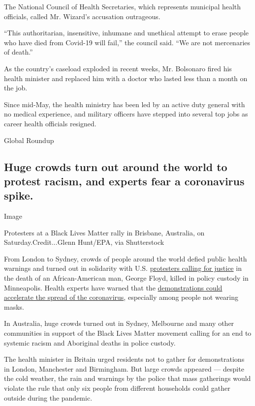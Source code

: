 The National Council of Health Secretaries, which represents municipal
health officials, called Mr. Wizard's accusation outrageous.

``This authoritarian, insensitive, inhumane and unethical attempt to
erase people who have died from Covid-19 will fail,'' the council said.
``We are not mercenaries of death.''

As the country's caseload exploded in recent weeks, Mr. Bolsonaro fired
his health minister and replaced him with a doctor who lasted less than
a month on the job.

Since mid-May, the health ministry has been led by an active duty
general with no medical experience, and military officers have stepped
into several top jobs as career health officials resigned.

Global Roundup

\hypertarget{huge-crowds-turn-out-around-the-world-to-protest-racism-and-experts-fear-a-coronavirus-spike}{%
\subsection{Huge crowds turn out around the world to protest racism, and
experts fear a coronavirus
spike.}\label{huge-crowds-turn-out-around-the-world-to-protest-racism-and-experts-fear-a-coronavirus-spike}}

Image

Protesters at a Black Lives Matter rally in Brisbane, Australia, on
Saturday.Credit...Glenn Hunt/EPA, via Shutterstock

From London to Sydney, crowds of people around the world defied public
health warnings and turned out in solidarity with U.S.
\href{https://www.nytimes3xbfgragh.onion/2020/06/06/us/george-floyd-protests.html}{protesters
calling for justice} in the death of an African-American man, George
Floyd, killed in policy custody in Minneapolis. Health experts have
warned that the
\href{https://www.nytimes3xbfgragh.onion/2020/06/06/us/george-floyd-protests.html?action=click\&module=Top\%20Stories\&pgtype=Homepage\#link-2301563b}{demonstrations
could accelerate the spread of the coronavirus}, especially among people
not wearing masks.

In Australia, huge crowds turned out in Sydney, Melbourne and many other
communities in support of the Black Lives Matter movement calling for an
end to systemic racism and Aboriginal deaths in police custody.

The health minister in Britain urged residents not to gather for
demonstrations in London, Manchester and Birmingham. But large crowds
appeared --- despite the cold weather, the rain and warnings by the
police that mass gatherings would violate the rule that only six people
from different households could gather outside during the pandemic.

